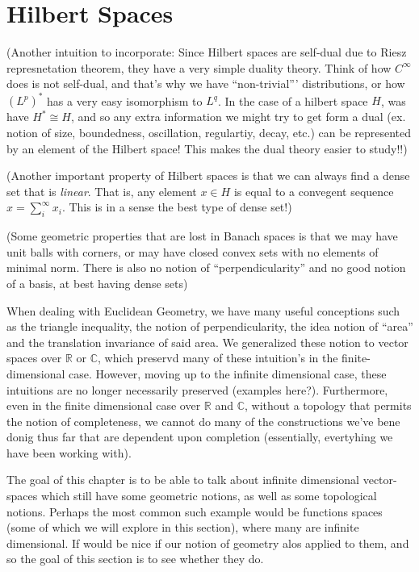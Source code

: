 \documentclass[oneside]{book}
\newcommand{\R}{\mathbb{R}}
\newcommand{\C}{\mathbb{C}}
\begin{document}
\chapter{Hilbert Spaces}\label{cha:hilbertSp}

(Another intuition to incorporate: Since Hilbert spaces are self-dual due to Riesz represnetation theorem, they have
a very simple duality theory. Think of how $C^\infty$ does is not self-dual, and that's why we have ``non-trivial'''
distributions, or how $(L^p)^*$ has a very easy isomorphism to $L^q$. In the case of a hilbert space $H$, was have $H^*
\cong H$, and so any extra information we might try to get form a dual (ex. notion of size, boundedness, oscillation,
regulartiy, decay, etc.) can be represented by an element of the Hilbert space! This makes the dual theory easier to
study!!)

(Another important property of Hilbert spaces is that we can always find a dense set that is \emph{linear}. That is, any
element $x \in H$ is equal to a convegent sequence $x = \sum_i^\infty x_i$. This is in a sense the best type of dense
set!)

(Some geometric properties that are lost in Banach spaces is that we may have unit balls with corners, or may have
closed convex sets with no elements of minimal norm. There is also no notion of ``perpendicularity'' and no good
notion of a basis, at best having dense sets)

When dealing with Euclidean Geometry, we have many useful conceptions such as the triangle inequality, the notion of
perpendicularity, the idea notion of ``area'' and the translation invariance of said area. We generalized these notion
to vector spaces over $\R$ or $\C$, which preservd many of these intuition's in the finite-dimensional case. However,
moving up to the infinite dimensional case, these intuitions are no longer necessarily preserved (examples here?).
Furthermore, even in the finite dimensional case over $\R$ and $\C$, without a topology that permits the notion of
completeness, we cannot do many of the constructions we've bene donig thus far that are dependent upon completion
(essentially, evertyhing we have been working with).

The goal of this chapter is to be able to talk about infinite dimensional vector-spaces which still have some geometric
notions, as well as some topological notions. Perhaps the most common such example would be functions spaces (some of
which we will explore in this section), where many are infinite dimensional. If would be nice if our notion of geometry
alos applied to them, and so the goal of this section is to see whether they do.
\end{document}
